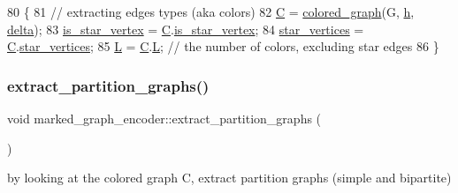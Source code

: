 \begin{DoxyCode}
80 \{
81   \textcolor{comment}{// extracting edges types (aka colors)}
82   \hyperlink{classmarked__graph__encoder_af82bc0653414091291cb75553a407bdb}{C} = \hyperlink{classcolored__graph}{colored\_graph}(G, \hyperlink{classmarked__graph__encoder_ae7f8872c57d2d64e4ca6cc47387b9b58}{h}, \hyperlink{classmarked__graph__encoder_a29dcf42526b12cf7964a556bb1025c9b}{delta});
83   \hyperlink{classmarked__graph__encoder_a4ce8d85a7b63aed1272ec9824710ce45}{is\_star\_vertex} = \hyperlink{classmarked__graph__encoder_af82bc0653414091291cb75553a407bdb}{C}.\hyperlink{classcolored__graph_a00d0c64fcf8de58553aa4cade64193df}{is\_star\_vertex};
84   \hyperlink{classmarked__graph__encoder_a08fdf6fcd7dcd8c5d1667f2d7ff06c2c}{star\_vertices} = \hyperlink{classmarked__graph__encoder_af82bc0653414091291cb75553a407bdb}{C}.\hyperlink{classcolored__graph_ab7ee8d717abde7ad7467ef695038f574}{star\_vertices};
85   \hyperlink{classmarked__graph__encoder_a0f2e2dd184fe262f6fc93f375215227e}{L} = \hyperlink{classmarked__graph__encoder_af82bc0653414091291cb75553a407bdb}{C}.\hyperlink{classcolored__graph_ae159d1b15106b70a2eabef8884501e97}{L}; \textcolor{comment}{// the number of colors, excluding star edges }
86 \}
\end{DoxyCode}
\mbox{\label{classmarked__graph__encoder_a60b0038c57bd8fa2f5cb3f0b6999c4f3}} 
\subsubsection{\texorpdfstring{extract\+\_\+partition\+\_\+graphs()}{extract\_partition\_graphs()}}
{\footnotesize\ttfamily void marked\+\_\+graph\+\_\+encoder\+::extract\+\_\+partition\+\_\+graphs (\begin{DoxyParamCaption}{ }\end{DoxyParamCaption})\hspace{0.3cm}{\ttfamily [private]}}



by looking at the colored graph C, extract partition graphs (simple and bipartite) 


